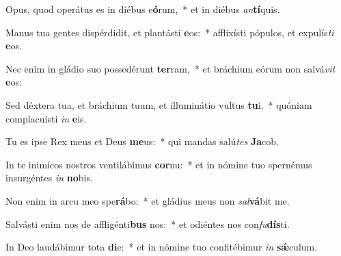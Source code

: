 \item Opus, quod operátus es in diébus e\textbf{ó}rum,~* et in diébus \textit{an}\textbf{tí}quis.
\item Manus tua gentes dispérdidit, et plantásti \textbf{e}os:~* afflixísti pópulos, et expulís\textit{ti} \textbf{e}os.
\item Nec enim in gládio suo possedérunt \textbf{ter}ram,~* et bráchium eórum non salvá\textit{vit} \textbf{e}os:
\item Sed déxtera tua, et bráchium tuum, et illuminátio vultus \textbf{tu}i,~* quóniam complacuísti \textit{in} \textbf{e}is.
\item Tu es ipse Rex meus et Deus \textbf{me}us:~* qui mandas salú\textit{tes} \textbf{Ja}cob.
\item In te inimícos nostros ventilábimus \textbf{cor}nu:~* et in nómine tuo spernémus insurgéntes \textit{in} \textbf{no}bis.
\item Non enim in arcu meo spe\textbf{rá}bo:~* et gládius meus non \textit{sal}\textbf{vá}bit me.
\item Salvásti enim nos de affligénti\textbf{bus} nos:~* et odiéntes nos con\textit{fu}\textbf{dís}ti.
\item In Deo laudábimur tota \textbf{di}e:~* et in nómine tuo confitébimur \textit{in} \textbf{sǽ}culum.
